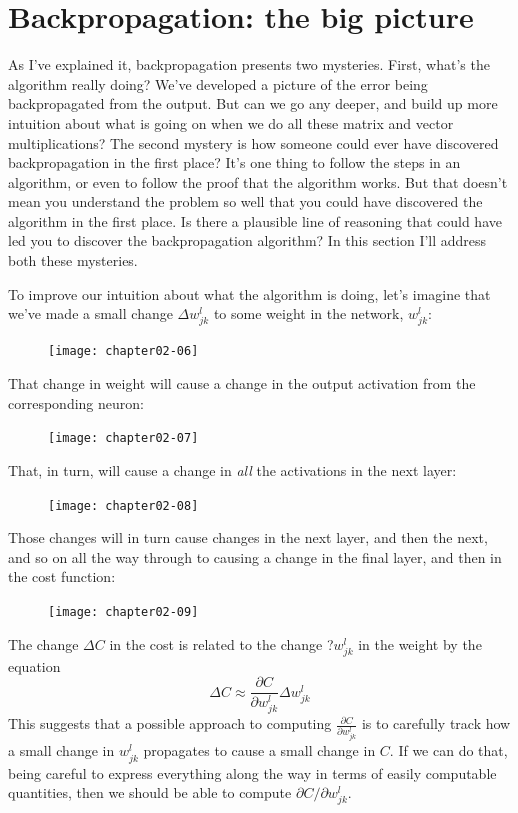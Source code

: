 \section{Backpropagation: the big picture}
\label{sec:Backpropagation:thebigpicture}

As I've explained it, backpropagation presents two mysteries. First, what's the algorithm really doing? We've developed a picture of the error being backpropagated from the output. But can we go any deeper, and build up more intuition about what is going on when we do all these matrix and vector multiplications? The second mystery is how someone could ever have discovered backpropagation in the first place? It's one thing to follow the steps in an algorithm, or even to follow the proof that the algorithm works. But that doesn't mean you understand the problem so well that you could have discovered the algorithm in the first place. Is there a plausible line of reasoning that could have led you to discover the backpropagation algorithm? In this section I'll address both these mysteries.

To improve our intuition about what the algorithm is doing, let's imagine that we've made a small change $\Delta w_{j k}^{l}$ to some weight in the network, $w^l_{jk}$: 

\begin{figure}
\texttt{[image: chapter02-06]}
\end{figure}

That change in weight will cause a change in the output activation from the corresponding neuron: 

\begin{figure}
\texttt{[image: chapter02-07]}
\end{figure}

That, in turn, will cause a change in \textit{all} the activations in the next layer: 

\begin{figure}
\texttt{[image: chapter02-08]}
\end{figure}

Those changes will in turn cause changes in the next layer, and then the next, and so on all the way through to causing a change in the final layer, and then in the cost function: 

\begin{figure}
\texttt{[image: chapter02-09]}
\end{figure}


The change $\Delta C$ in the cost is related to the change ?$w^l_{jk}$ in the weight by the equation 
\begin{equation}
\Delta C \approx \frac{\partial C}{\partial w_{j k}^{l}} \Delta w_{j k}^{l}
\label{eq:c02-47}
\end{equation}
This suggests that a possible approach to computing $\frac{\partial C}{\partial w_{j k}^{l}}$ is to carefully track how a small change in $w^l_{jk}$ propagates to cause a small change in $C$. If we can do that, being careful to express everything along the way in terms of easily computable quantities, then we should be able to compute $\partial C / \partial w_{j k}^{l}$.

